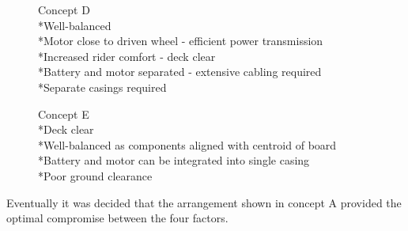 \documentclass[journal,10pt]{IEEEtran}
\begin{document}
        \begin{figure}[H]
                \centering
                \caption{Concept D
                \\*Well-balanced
                \\*Motor close to driven wheel - efficient power transmission
                \\*Increased rider comfort - deck clear
                \\*Battery and motor separated - extensive cabling required
                \\*Separate casings required}
                \label{Fig:ConceptD}
            \end{figure} 
        \begin{figure}[H]
                \centering
                \caption{Concept E
                \\*Deck clear
                \\*Well-balanced as components aligned with centroid of board
                \\*Battery and motor can be integrated into single casing
                \\*Poor ground clearance
                }
                \label{Fig:ConceptE}
            \end{figure}
        Eventually it was decided that the arrangement shown in concept A provided the optimal compromise between the four factors.
\end{document}
